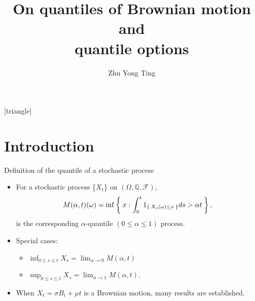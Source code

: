 \documentclass[cjk,10pt]{beamer}
\begin{document}
[triangle]

\title{On quantiles of Brownian motion and \\
quantile options}
\author{Zhu Yong Ting}
\date{} \frame{\titlepage}

%


\section{Introduction} 
\begin{frame}{Definition of the quantile of a stochastic process}
\begin{itemize}
\item
For a stochastic process \{$X_t$\} on $(\Omega, \mathbb Q, \mathcal F)$, \\
\begin{equation}
M(\alpha,t)(\omega) = \inf\Set{x:\int_0^t 1_{\Set{X_s (\omega)\leq x}}ds > \alpha t},
\end{equation}
is the corresponding $\alpha$-quantile $(0 \leq \alpha \leq 1)$ process.
\item
Special cases:
\begin{itemize}
\item $\displaystyle\inf_{0\leq s \leq t}  X_s = \lim_{\alpha\to 0}M(\alpha,t)$
\item $\displaystyle\sup_{0\leq s \leq t} X_s = \lim_{\alpha\to 1} M(\alpha, t)$.
\end{itemize}
\item When $X_t = \sigma B_t + \mu t$ is a Brownian motion, many results are established. 
\end{itemize}

\end{frame}
\end{document}
